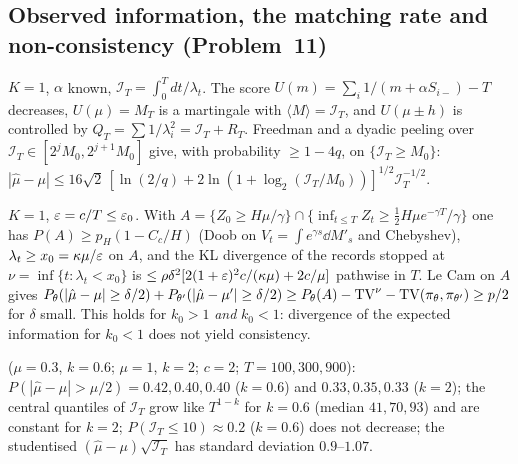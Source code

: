 \subsection{Observed information, the matching rate and non-consistency (Problem~11)}
\begin{theorem}\label{thm:UB}\Pt{}
$K=1$, $\alpha$ known, $\mathcal I_T=\int_0^Tdt/\lambda_t$. The score $U(m)=\sum_i1/(m+\alpha S_{i-})-T$ decreases, $U(\mu)=M_T$ is a martingale with $\langle M\rangle=\mathcal I_T$, and $U(\mu\pm h)$ is controlled by $Q_T=\sum1/\lambda_i^2=\mathcal I_T+R_T$. Freedman and a dyadic peeling over $\mathcal I_T\in[2^jM_0,2^{j+1}M_0]$ give, with probability $\ge1-4q$, on $\{\mathcal I_T\ge M_0\}$: $|\hat\mu-\mu|\le16\sqrt2\,[\ln(2/q)+2\ln(1+\log_2(\mathcal I_T/M_0))]^{1/2}\mathcal I_T^{-1/2}$.
\end{theorem}
\begin{theorem}\label{thm:NC}\Ps{}
$K=1$, $\varepsilon=c/T\le\varepsilon_0$. With $A=\{Z_0\ge H\mu/\gamma\}\cap\{\inf_{t\le T}Z_t\ge\frac12H\mu e^{-\gamma T}/\gamma\}$ one has $P(A)\ge p_H(1-C_c/H)$ (Doob on $V_t=\int e^{\gamma s}\dd M'_s$ and Chebyshev), $\lambda_t\ge x_0=\kappa\mu/\varepsilon$ on $A$, and the KL divergence of the records stopped at $\nu=\inf\{t:\lambda_t<x_0\}$ is $\le\rho\delta^2[2(1+\varepsilon)^2c/(\kappa\mu)+2c/\mu]$ pathwise in $T$. Le Cam on $A$ gives $P_\theta(|\hat\mu-\mu|\ge\delta/2)+P_{\theta'}(|\hat\mu-\mu'|\ge\delta/2)\ge P_\theta(A)-\mathrm{TV}^\nu-\mathrm{TV}(\pi_\theta,\pi_{\theta'})\ge p/2$ for $\delta$ small. This holds for $k_0>1$ \emph{and} $k_0<1$: divergence of the expected information for $k_0<1$ does not yield consistency.
\end{theorem}
\Nt{} ($\mu=0.3$, $k=0.6$; $\mu=1$, $k=2$; $c=2$; $T=100,300,900$): $P(|\hat\mu-\mu|>\mu/2)=0.42,0.40,0.40$ ($k=0.6$) and $0.33,0.35,0.33$ ($k=2$); the central quantiles of $\mathcal I_T$ grow like $T^{1-k}$ for $k=0.6$ (median $41,70,93$) and are constant for $k=2$; $P(\mathcal I_T\le10)\approx0.2$ ($k=0.6$) does not decrease; the studentised $(\hat\mu-\mu)\sqrt{\mathcal I_T}$ has standard deviation $0.9$--$1.07$.

